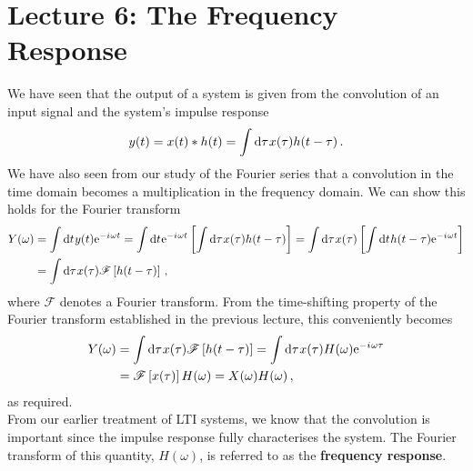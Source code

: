 \section{Lecture 6: The Frequency Response}

We have seen that the output of a system is given from the
convolution of an input signal and the system's impulse response
%
\begin{displaymath}
  y(t) = x(t) * h(t) = \int\mathrm{d}\tau\mkern1mux(\tau)h(t-\tau) \,.
\end{displaymath}
%
We have also seen from our study of the Fourier series that a
convolution in the time domain becomes a multiplication in the
frequency domain. We can show this holds for the Fourier transform
%
\begin{align*}
  Y(\omega) &= \int\mathrm{d}t\mkern1mu y(t)\mathrm{e}^{-{i\mkern1mu}\omega t}
  = \int\mathrm{d}t\mkern1mu\mathrm{e}^{-{i\mkern1mu}\omega t}\left[\int\mathrm{d}\tau\mkern1mux(\tau)h(t-\tau)\right]
  = \int\mathrm{d}\tau\mkern1mux(\tau)\left[\int\mathrm{d}t\mkern1muh(t-\tau)\mathrm{e}^{-{i\mkern1mu}\omega t}\right] \\
  &= \int \mathrm{d}\tau\mkern1mux(\tau)\mathscr{F}\left[h(t-\tau)\right] \,,
\end{align*}
%
where $\mathscr{F}$ denotes a Fourier transform. From the time-shifting
property of the Fourier transform established in the previous lecture,
this conveniently becomes
%
\begin{align*}
  Y(\omega) &= \int \mathrm{d}\tau\mkern1mux(\tau)\mathscr{F}\left[h(t-\tau)\right]
  = \int \mathrm{d}\tau\mkern1mux(\tau)H(\omega)\mathrm{e}^{-{i\mkern1mu}\omega\tau} \\
  &= \mathscr{F}\left[x(\tau)\right]H(\omega) = X(\omega)H(\omega) \,,
\end{align*}
%
as required.\\

From our earlier treatment of LTI systems, we know that the convolution
is important since the impulse response fully characterises the system.
The Fourier transform of this quantity, $H(\omega)$, is referred to as
the \textbf{frequency response}.

